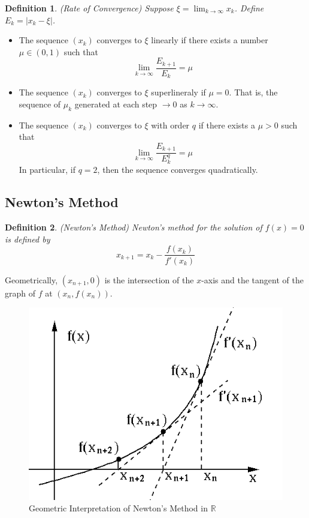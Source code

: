 \documentclass[12pt]{article}
\newtheorem{definition}{Definition}
\theoremstyle{definition}
\newcommand{\R}{\mathbb{R}}
\begin{document}
\begin{definition}(Rate of Convergence)
Suppose $\xi = \lim_{k \to \infty} x_k$. Define $E_k = |x_k - \xi|$.
\end{definition}
\begin{itemize}
\item The sequence $(x_k)$ converges to $\xi$ linearly if there exists a number $\mu \in (0,1)$ such that 
\begin{equation}
\lim_{k \to \infty} \frac{E_{k+1}}{E_k} = \mu
\end{equation}
\item The sequence $(x_k)$ converges to $\xi$ superlineraly if $\mu = 0$. That is, the sequence of $\mu_k$ generated at each step $\rightarrow 0$ as $k \rightarrow \infty$.
\item The sequence $(x_k)$ converges to $\xi$ with order $q$ if there exists a $\mu > 0$ such that
\begin{equation}
\lim_{k \to \infty} \frac{E_{k+1}}{E_k^q} = \mu
\end{equation}
In particular, if $q=2$, then the sequence converges quadratically.
\end{itemize}

\subsection{Newton's Method}

\begin{definition}(Newton's Method)
Newton's method for the solution of $f(x) = 0$ is defined by 
\begin{equation}
	x_{k+1} = x_k - \frac{f(x_k)}{f'(x_k)}
\end{equation}
\end{definition}

Geometrically, $(x_{n+1}, 0)$ is the intersection of the $x$-axis and the tangent of the graph of $f$ at $(x_n, f(x_n))$. 

\begin{figure}[H]
	\begin{center}
		\includegraphics[scale=.5]{newton_method.png}
	\end{center}
	\caption{Geometric Interpretation of Newton's Method in $\R$}
\end{figure}
\end{document}
